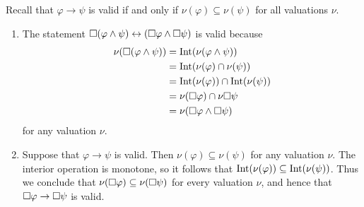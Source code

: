 \documentclass{article}
\begin{document}
\maketitle

\begin{ex}
\end{ex}

\begin{ex}
\end{ex}

\begin{ex}
Recall that $\varphi\to\psi$ is valid if
and only if $\nu(\varphi)\subseteq\nu(\psi)$ for all valuations $\nu$. 
\begin{enumerate}
\item The statement $\square(\varphi\land\psi)\leftrightarrow(\square\varphi\land\square\psi)$
is valid because
\begin{align*}
\nu(\square(\varphi\land\psi))
  & =
\mathrm{Int}(\nu(\varphi\land\psi))
  \\
  & =
\mathrm{Int}(\nu(\varphi)\cap\nu(\psi))
  \\
  & =
\mathrm{Int}(\nu(\varphi))\cap\mathrm{Int}(\nu(\psi))
  \\
  & =
\nu(\square\varphi)\cap\nu{\square\psi}
  \\
  & =
\nu(\square\varphi\land\square\psi)
\end{align*}
for any valuation $\nu$.
\item Suppose that $\varphi\to\psi$ is valid. Then $\nu(\varphi)\subseteq\nu(\psi)$
for any valuation $\nu$. The interior operation is monotone, so it follows that
$\mathrm{Int}(\nu(\varphi))\subseteq\mathrm{Int}(\nu(\psi))$. Thus we conclude that
$\nu(\square\varphi)\subseteq\nu(\square\psi)$ for every valuation $\nu$, 
and hence that $\square\varphi\to\square\psi$ is valid.
\end{enumerate}
\end{ex}
\end{document}
